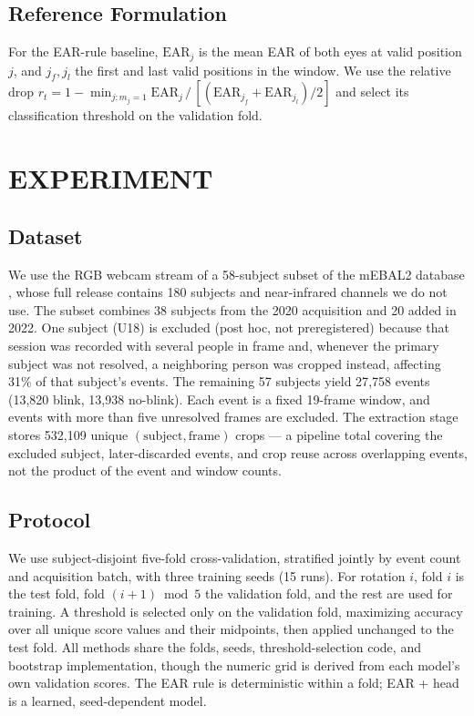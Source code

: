 \documentclass{IEEEmce}
\begin{document}
\subsection{Reference Formulation}
For the EAR-rule baseline, $\mathrm{EAR}_j$ is the mean EAR of both eyes at valid
position $j$, and $j_f,j_l$ the first and last valid positions in the window. We use the
relative drop
$r_t=1-\min_{j:m_j=1}\mathrm{EAR}_j\,/\,[(\mathrm{EAR}_{j_f}+\mathrm{EAR}_{j_l})/2]$ and
select its classification threshold on the validation fold.

\section{EXPERIMENT}

\subsection{Dataset}
We use the RGB webcam stream of a 58-subject subset of the mEBAL2 database
\cite{daza2024}, whose full release contains 180 subjects and near-infrared channels we
do not use. The subset combines 38 subjects from the 2020 acquisition and 20 added in
2022. One subject (U18) is excluded (post hoc, not preregistered) because that session
was recorded with several people in frame and, whenever the primary subject was not
resolved, a neighboring person was cropped instead, affecting 31\% of that subject's
events. The remaining 57 subjects yield 27{,}758 events (13{,}820 blink, 13{,}938
no-blink). Each event is a fixed 19-frame window, and events with more than five
unresolved frames are excluded. The extraction stage stores 532{,}109 unique
$(\text{subject},\text{frame})$ crops --- a pipeline total covering the excluded
subject, later-discarded events, and crop reuse across overlapping events, not the
product of the event and window counts.

\subsection{Protocol}
We use subject-disjoint five-fold cross-validation, stratified jointly by event count
and acquisition batch, with three training seeds (15 runs). For rotation $i$, fold $i$
is the test fold, fold $(i+1)\bmod 5$ the validation fold, and the rest are used for
training. A threshold is selected only on the validation fold, maximizing accuracy over
all unique score values and their midpoints, then applied unchanged to the test fold.
All methods share the folds, seeds, threshold-selection code, and bootstrap
implementation, though the numeric grid is derived from each model's own validation
scores. The EAR rule is deterministic within a fold; EAR + head is a learned,
seed-dependent model.
\end{document}
